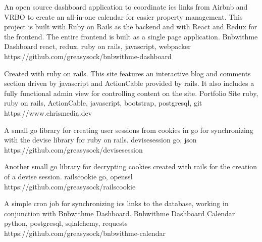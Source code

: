 \documentclass[]{awesome-cv}
\begin{document}
\vspace{-7mm}
\begin{cventries}
	\cventry
	{An open source dashboard application to coordinate ics links from Airbnb and VRBO to create an all-in-one calendar for easier property management. This project is built with Ruby on Rails as the backend and with React and Redux for the frontend. The entire frontend is built as a single page application.}
	{Bnbwithme Dashboard}
	{react, redux, ruby on rails, javascript, webpacker}
	{https://github.com/greasysock/bnbwithme-dashboard}
	{}
	
	\vspace{-5mm}
	\cventry
	{Created with ruby on rails. This site features an interactive blog and comments section driven by javascript and ActionCable provided by rails. It also includes a fully functional admin view for controlling content on the site.}
	{Portfolio Site}
	{ruby, ruby on rails, ActionCable, javascript, bootstrap, postgresql, git}
	{https://www.chrismedia.dev}
	{}
	
	\vspace{-5mm}
\end{cventries}

\vspace{3mm}
\begin{cventries}
	\cventry
	{A small go library for creating user sessions from cookies in go for synchronizing with the devise library for ruby on rails.}
	{devisesession}
	{go, json}
	{https://github.com/greasysock/devisesession}
	{}
	
	\vspace{-5mm}
	\cventry
	{Another small go library for decrypting cookies created with rails for the creation of a devise session.}
	{railscookie}
	{go, openssl}
	{https://github.com/greasysock/railscookie}
	{}

	\vspace{-5mm}
	\cventry
	{A simple cron job for synchronizing ics links to the database, working in conjunction with Bnbwithme Dashboard.}
	{Bnbwithme Dashboard Calendar}
	{python, postgresql, sqlalchemy, requests}
	{https://github.com/greasysock/bnbwithme-calendar}
	{}
\end{cventries}

\ 
\end{document}
